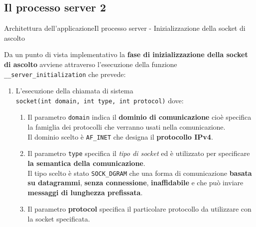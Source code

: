 \documentclass[10pt]{beamer}
\begin{document}
\subsection{Il processo server 2}
\begin{frame}{Architettura dell'applicazione}{Il processo server - Inizializzazione della socket di ascolto}

Da un punto di vista implementativo la \textbf{fase di inizializzazione della socket di ascolto} avviene attraverso l'esecuzione della funzione \texttt{\_\_server\_initialization} che prevede:

\begin{enumerate}
\item L'esecuzione della chiamata di sistema \\ \texttt{socket(int domain, int type, int protocol)} dove:
\begin{enumerate}
\vspace*{10px}
\item Il parametro \texttt{domain} indica il \textbf{dominio di comunicazione} cioè specifica la famiglia dei protocolli che verranno usati nella comunicazione. \\ Il dominio scelto è \texttt{AF\_INET} che designa il \textbf{protocollo IPv4}.
\vspace*{10px}
\item Il parametro \texttt{type} specifica il \textit{tipo di socket} ed è utilizzato per specificare \textbf{la semantica della comunicazione}. \\ Il tipo scelto è stato \texttt{SOCK\_DGRAM} che una forma di comunicazione \textbf{basata su datagrammi}, \textbf{senza connessione}, \textbf{inaffidabile} e che può inviare \textbf{messaggi di lunghezza prefissata}.
\vspace*{10px}
\item Il parametro \textbf{protocol} specifica il particolare protocollo da utilizzare con la socket specificata. \\
\end{enumerate}

\end{enumerate}

\end{frame}

\end{document}
